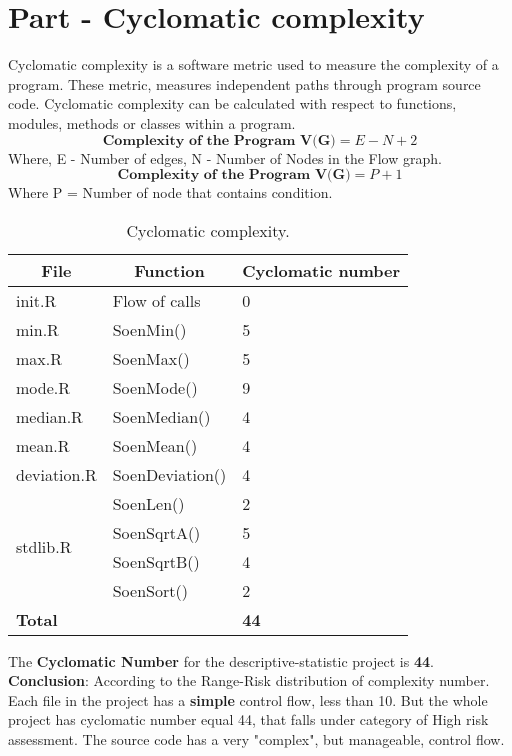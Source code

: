 \documentclass[12pt]{article}
\begin{document}
\section{Part - Cyclomatic complexity}
Cyclomatic complexity is a software metric used to measure the complexity of a program. These metric, measures independent paths through program source code. Cyclomatic complexity can be calculated with respect to functions, modules, methods or classes within a program.
\begin{equation}
    \textbf{Complexity of the Program V(G)} = E - N + 2
\end{equation}
Where, E - Number of edges, N - Number of Nodes in the Flow graph.
\begin{equation}
    \textbf{Complexity of the Program V(G)} = P + 1 
\end{equation}
Where P = Number of node that contains condition.
\begin{table}[h]
\centering
\begin{tabular}{|l|l|l|}
\hline
\multicolumn{1}{|c|}{\textbf{File}} & \multicolumn{1}{c|}{\textbf{Function}} & \multicolumn{1}{c|}{\textbf{Cyclomatic number}} \\ \hline
init.R & Flow of calls & 0 \\ \hline
min.R & SoenMin() & 5 \\ \hline
max.R & SoenMax() & 5 \\ \hline
mode.R & SoenMode() & 9 \\ \hline
median.R & SoenMedian() & 4 \\ \hline
mean.R & SoenMean() & 4 \\ \hline
deviation.R & SoenDeviation() & 4 \\ \hline
\multirow{4}{*}{stdlib.R} & SoenLen() & 2 \\ \cline{2-3} 
 & SoenSqrtA() & 5 \\ \cline{2-3} 
 & SoenSqrtB() & 4 \\ \cline{2-3} 
 & SoenSort() & 2 \\ \hline
\textbf{Total} & \textbf{} & \textbf{44} \\ \hline
\end{tabular}
\caption{Cyclomatic complexity.}
\label{my-label}
\end{table}

The \textbf{Cyclomatic Number} for the descriptive-statistic project is \textbf{44}.\\

\textbf{Conclusion}: According to the Range-Risk distribution of complexity number. Each file in the project has a \textbf{simple} control flow, less than 10. But the whole project has cyclomatic number equal 44, that falls under category of High risk assessment. The source code has a very "complex", but manageable, control flow. 
\end{document}
